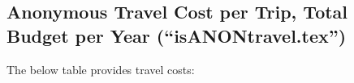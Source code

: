 \documentclass[usenames,dvipsnames,modern]{CLASS_FILES/aastex631}
\begin{document}
\subsection{\textbf{Anonymous} Travel Cost per Trip, Total Budget per Year (``isANONtravel.tex'')}
\def\myBannerBoldface#1{\textbf{#1}} %
\def\myBannerColor{Blue} %
\def\myBannerFontColor{White} %
\def\myPerTripShadingColor{gray} %
\def\myPerTripShadingOpacity{0.85} %
\def\myYearTripsDestLabelFontColor{Blue} %
\def\myTotalLabelFontColor{Blue} %
\def\myPerTripLabelFontColor{Blue} %
\def\myYearTripsDestBoldface#1{\textbf{#1}} %
\def\myPerTripBoldface#1{\textbf{#1}} %
\def\myTotalBoldface#1{\textbf{#1}} %
\def\myYearBoldface#1{\textbf{#1}} %
%
The below table provides travel costs:
\end{document}
